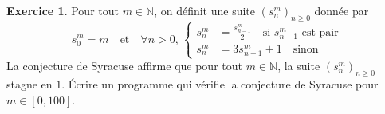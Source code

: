 \documentclass[french,a4paper]{article}
\theoremstyle{definition}
\newtheorem{exercise}{Exercice}
\theoremstyle{remark}
\begin{document}
\begin{exercise}
  Pour tout $m \in \mathbb N$, on définit une suite
  $(s^m_n)_{n\geq 0}$ donnée par
  \begin{displaymath}
    s^m_0 = m \quad \text{et} \quad
    \forall n>0,\, \left\{
      \begin{aligned}
        s^m_n &= \frac{s^m_{n-1}} 2
        \quad \text{si $s^m_{n-1}$ est pair} \\
        s^m_n &= 3{s^m_{n-1}}+1 \quad \text{sinon}
      \end{aligned}
    \right.
  \end{displaymath}
  La conjecture de Syracuse affirme que pour tout $m \in \mathbb N$,
  la suite $(s^m_n)_{n\geq 0}$ stagne en $1$. \'Ecrire un programme
  qui vérifie la conjecture de Syracuse pour $m \in [0,100]$.
\end{exercise}
\end{document}
